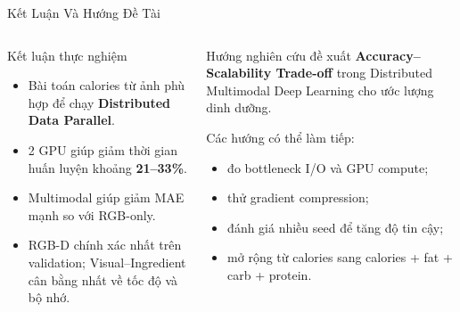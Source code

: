 \documentclass[10pt,aspectratio=169]{beamer}
\newcommand{\highlight}[1]{\textcolor{accent}{\bfseries #1}}
\newcommand{\kw}[1]{\textcolor{uitblue}{\bfseries #1}}
\begin{document}
\begin{frame}{Kết Luận Và Hướng Đề Tài}
\scriptsize
\begin{columns}[T]
\begin{uitbox}{Kết luận thực nghiệm}
\begin{itemize}
  \item Bài toán calories từ ảnh phù hợp để chạy \kw{Distributed Data Parallel}.
  \item 2 GPU giúp giảm thời gian huấn luyện khoảng \highlight{21--33\%}.
  \item Multimodal giúp giảm MAE mạnh so với RGB-only.
  \item RGB-D chính xác nhất trên validation; Visual--Ingredient cân bằng nhất về tốc độ và bộ nhớ.
\end{itemize}
\end{uitbox}

\begin{accentbox}{Hướng nghiên cứu đề xuất}
\textbf{Accuracy--Scalability Trade-off} trong Distributed Multimodal Deep Learning cho ước lượng dinh dưỡng.

\vspace{0.10cm}
Các hướng có thể làm tiếp:
\begin{itemize}
  \item đo bottleneck I/O và GPU compute;
  \item thử gradient compression;
  \item đánh giá nhiều seed để tăng độ tin cậy;
  \item mở rộng từ calories sang calories + fat + carb + protein.
\end{itemize}
\end{accentbox}
\end{columns}
\end{frame}
\end{document}
